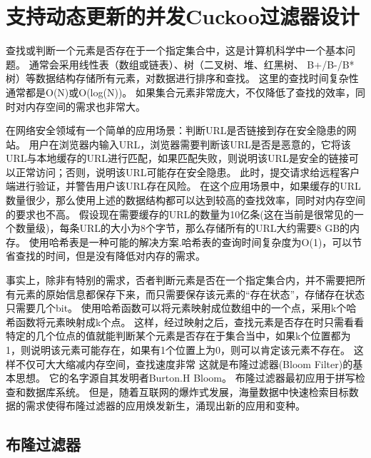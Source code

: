 \chapter{支持动态更新的并发Cuckoo过滤器设计}
查找或判断一个元素是否存在于一个指定集合中，这是计算机科学中一个基本问题。
通常会采用线性表（数组或链表）、树（二叉树、堆、红黑树、 B+/B-/B*树）等数据结构存储所有元素，对数据进行排序和查找。
这里的查找时间复杂性通常都是O(N)或O(log(N))。
如果集合元素非常庞大，不仅降低了查找的效率，同时对内存空间的需求也非常大。

在网络安全领域有一个简单的应用场景：判断URL是否链接到存在安全隐患的网站。
用户在浏览器内输入URL，浏览器需要判断该URL是否是恶意的，它将该URL与本地缓存的URL进行匹配，如果匹配失败，则说明该URL是安全的链接可以正常访问；否则，说明该URL可能存在安全隐患。
此时，提交请求给远程客户端进行验证，并警告用户该URL存在风险。
在这个应用场景中，如果缓存的URL数量很少，那么使用上述的数据结构都可以达到较高的查找效率，同时对内存空间的要求也不高。
假设现在需要缓存的URL的数量为10亿条(这在当前是很常见的一个数量级)，每条URL的大小为8个字节，那么存储所有的URL大约需要8 GB的内存。
使用哈希表是一种可能的解决方案.哈希表的查询时间复杂度为O(1)，可以节省查找的时间，但是没有降低对内存的需求。

事实上，除非有特别的需求，否者判断元素是否在一个指定集合内，并不需要把所有元素的原始信息都保存下来，而只需要保存该元素的“存在状态”，存储存在状态只需要几个bit。
使用哈希函数可以将元素映射成位数组中的一个点，采用k个哈希函数将元素映射成k个点。
这样，经过映射之后，查找元素是否存在时只需看看特定的几个位点的值就能判断某个元素是否存在于集合当中，如果k个位置都为1，则说明该元素可能存在，如果有1个位置上为0，则可以肯定该元素不存在。
这样不仅可大大缩减内存空间，查找速度非常
这就是布隆过滤器(Bloom Filter)的基本思想。
它的名字源自其发明者Burton.H Bloom\cite{bloom1970space}。
布隆过滤器最初应用于拼写检查和数据库系统。
但是，随着互联网的爆炸式发展，海量数据中快速检索目标数据的需求使得布隆过滤器的应用焕发新生，涌现出新的应用和变种\cite{bender2012don,bonomi2006improved,song2005fast,yu2009buffalo}。

\section{布隆过滤器}


